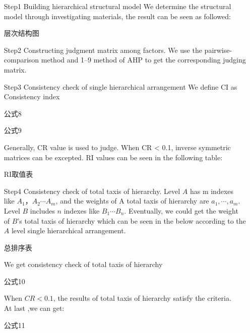 \begin{itemize}
    \item[Step1]Building hierarchical structural model
    We determine the structural model through investigating materials, the result can be seen as followed:
    
    层次结构图
    
    
    \item[Step2] Constructing judgment matrix among factors.
    We use the pairwise-comparison method and 1–9 method of AHP to get the corresponding judging matrix.
    \item[Step3] Consistency check of single hierarchical arrangement 
    We define CI as Consistency index
    
    公式8
    
    公式9
    
    Generally, CR value is used to judge. When CR < 0.1, inverse symmetric matrices can be excepted. RI values can be seen in the following table:
    
    RI取值表
    
    \item[Step4] Consistency check of total taxis of hierarchy.
    Level $A$ has m indexes like $A_1，A_2 \cdots A_m$, and the weights of A total taxis of hierarchy are $a_1, \cdots, a_m$. Level $B$ includes $n$ indexes like $B_1 \cdots B_n$.
    Eventually, we could get the weight of $B$’s total taxis of hierarchy which can be seen in the below according to the $A$ level single hierarchical arrangement.
    
    总排序表
    
    We get consistency check of total taxis of hierarchy
    
    公式10
    
    When $CR < 0.1$, the results of total taxis of hierarchy satisfy the criteria.\\
    At last ,we can get:
    
    公式11
    
\end{itemize}\par

